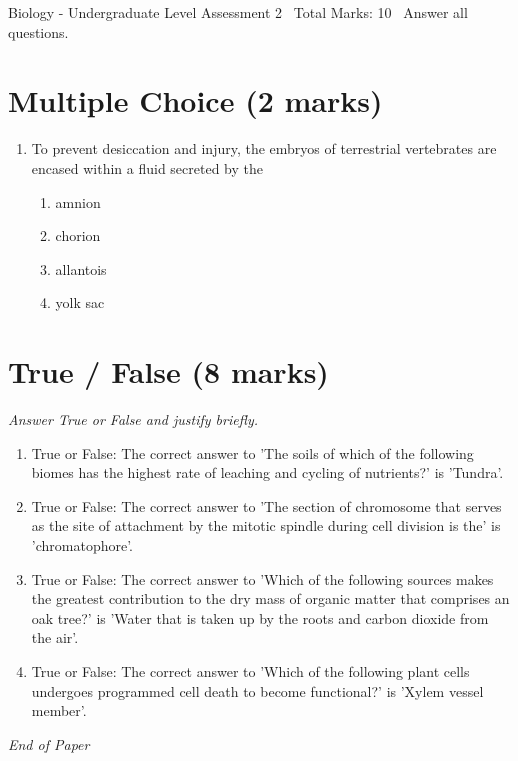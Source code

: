 \documentclass[12pt]{article}
\begin{document}
\begin{center}
Biology - Undergraduate Level Assessment 2 \
Total Marks: 10 \
Answer all questions.
\end{center}

\section*{Multiple Choice (2 marks)}
\begin{enumerate}[label=\arabic*.]
\item To prevent desiccation and injury, the embryos of terrestrial vertebrates are encased within a fluid secreted by the
\begin{enumerate}[label=(\alph*)]
    \item amnion
    \item chorion
    \item allantois
    \item yolk sac
\end{enumerate}
\end{enumerate}

\section*{True / False (8 marks)}
\textit{Answer True or False and justify briefly.}
\begin{enumerate}[label=\arabic*.]
\item True or False: The correct answer to 'The soils of which of the following biomes has the highest rate of leaching and cycling of nutrients?' is 'Tundra'.
\item True or False: The correct answer to 'The section of chromosome that serves as the site of attachment by the mitotic spindle during cell division is the' is 'chromatophore'.
\item True or False: The correct answer to 'Which of the following sources makes the greatest contribution to the dry mass of organic matter that comprises an oak tree?' is 'Water that is taken up by the roots and carbon dioxide from the air'.
\item True or False: The correct answer to 'Which of the following plant cells undergoes programmed cell death to become functional?' is 'Xylem vessel member'.
\end{enumerate}

\vfill
\noindent\textit{End of Paper}
\end{document}
